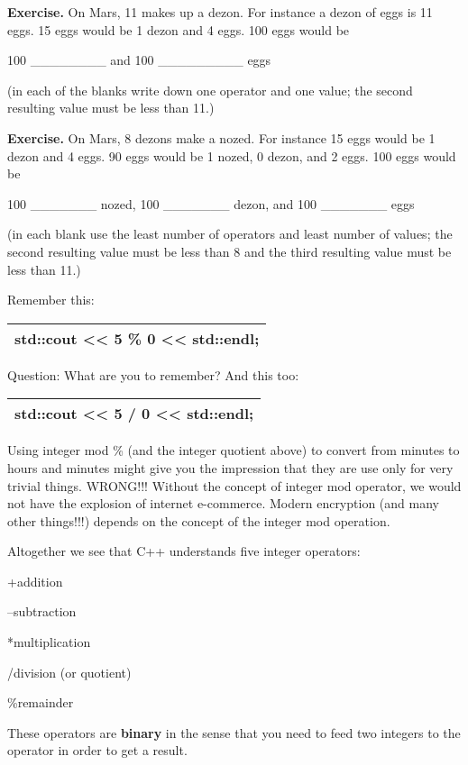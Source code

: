 \documentclass[
]{article}
\begin{document}
\textbf{Exercise.} On Mars, 11 makes up a dezon. For instance a dezon of
eggs is 11 eggs. 15 eggs would be 1 dezon and 4 eggs. 100 eggs would be

100 \_\_\_\_\_\_\_\_ and 100 \_\_\_\_\_\_\_\_\_ eggs

(in each of the blanks write down one operator and one value; the second
resulting value must be less than 11.)

\textbf{Exercise.} On Mars, 8 dezons make a nozed. For instance 15 eggs
would be 1 dezon and 4 eggs. 90 eggs would be 1 nozed, 0 dezon, and 2
eggs. 100 eggs would be

100 \_\_\_\_\_\_\_ nozed, 100 \_\_\_\_\_\_\_ dezon, and 100
\_\_\_\_\_\_\_ eggs

(in each blank use the least number of operators and least number of
values; the second resulting value must be less than 8 and the third
resulting value must be less than 11.)

Remember this:

\begin{longtable}[]{@{}l@{}}
\toprule
\endhead
std::cout \textless\textless{} 5 \% 0 \textless\textless{}
std::endl;\tabularnewline
\bottomrule
\end{longtable}

Question: What are you to remember? And this too:

\begin{longtable}[]{@{}l@{}}
\toprule
\endhead
std::cout \textless\textless{} 5 / 0 \textless\textless{}
std::endl;\tabularnewline
\bottomrule
\end{longtable}

Using integer mod \% (and the integer quotient above) to convert from
minutes to hours and minutes might give you the impression that they are
use only for very trivial things. WRONG!!! Without the concept of
integer mod operator, we would not have the explosion of internet
e-commerce. Modern encryption (and many other things!!!) depends on the
concept of the integer mod operation.

Altogether we see that C++ understands five integer operators:

+addition

--subtraction

*multiplication

/division (or quotient)

\%remainder

These operators are \textbf{binary} in the sense that you need to feed
two integers to the operator in order to get a result.
\end{document}
